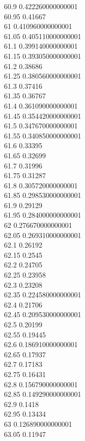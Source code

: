 {60.9	0.422260000000001\\
60.95	0.41667\\
61	0.410960000000001\\
61.05	0.405110000000001\\
61.1	0.399140000000001\\
61.15	0.393050000000001\\
61.2	0.38686\\
61.25	0.380560000000001\\
61.3	0.37416\\
61.35	0.36767\\
61.4	0.361090000000001\\
61.45	0.354420000000001\\
61.5	0.347670000000001\\
61.55	0.340850000000001\\
61.6	0.33395\\
61.65	0.32699\\
61.7	0.31996\\
61.75	0.31287\\
61.8	0.305720000000001\\
61.85	0.298530000000001\\
61.9	0.29129\\
61.95	0.284000000000001\\
62	0.276670000000001\\
62.05	0.269310000000001\\
62.1	0.26192\\
62.15	0.2545\\
62.2	0.24705\\
62.25	0.23958\\
62.3	0.23208\\
62.35	0.224580000000001\\
62.4	0.21706\\
62.45	0.209530000000001\\
62.5	0.20199\\
62.55	0.19445\\
62.6	0.186910000000001\\
62.65	0.17937\\
62.7	0.17183\\
62.75	0.16431\\
62.8	0.156790000000001\\
62.85	0.149290000000001\\
62.9	0.1418\\
62.95	0.13434\\
63	0.126890000000001\\
63.05	0.11947\\
}
